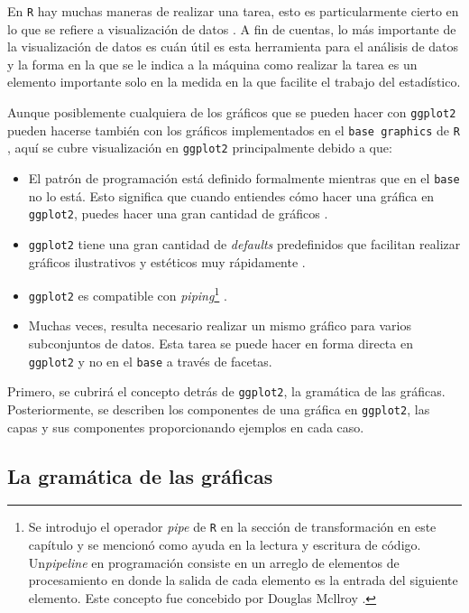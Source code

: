 \documentclass[]{article}
\providecommand{\tightlist}{%
  \setlength{\itemsep}{0pt}\setlength{\parskip}{0pt}}
\let\rmarkdownfootnote\footnote%
\def\footnote{\protect\rmarkdownfootnote}
\begin{document}
En \texttt{R} hay muchas maneras de realizar una tarea, esto es
particularmente cierto en lo que se refiere a visualización de datos
\parencite{basevggplot}. A fin de cuentas, lo más importante de la
visualización de datos es cuán útil es esta herramienta para el análisis
de datos y la forma en la que se le indica a la máquina como realizar la
tarea es un elemento importante solo en la medida en la que facilite el
trabajo del estadístico.

Aunque posiblemente cualquiera de los gráficos que se pueden hacer con
\texttt{ggplot2} pueden hacerse también con los gráficos implementados
en el \texttt{base\ graphics} de \texttt{R} \parencite{basevggplot},
aquí se cubre visualización en \texttt{ggplot2} principalmente debido a
que:

\begin{itemize}
\tightlist
\item
  El patrón de programación está definido formalmente mientras que en el
  \texttt{base} no lo está. Esto significa que cuando entiendes cómo
  hacer una gráfica en \texttt{ggplot2}, puedes hacer una gran cantidad
  de gráficos \parencite{basevggplot}.
\item
  \texttt{ggplot2} tiene una gran cantidad de \emph{defaults}
  predefinidos que facilitan realizar gráficos ilustrativos y estéticos
  muy rápidamente \parencite{reasonsggplot}.
\item
  \texttt{ggplot2} es compatible con
  \emph{piping}\footnote{Se introdujo el operador \textit{pipe} de \texttt{R} en la sección de transformación en este capítulo y se mencionó como ayuda en la lectura y escritura de código. Un\textit{pipeline} en programación consiste en un arreglo de elementos de procesamiento en donde la salida de cada elemento es la entrada del siguiente elemento. Este concepto fue concebido por Douglas Mcllroy \parencite{unixpipes}.}
  \parencite{notggplot}.
\item
  Muchas veces, resulta necesario realizar un mismo gráfico para varios
  subconjuntos de datos. Esta tarea se puede hacer en forma directa en
  \texttt{ggplot2} y no en el \texttt{base} a través de facetas.
\end{itemize}

Primero, se cubrirá el concepto detrás de \texttt{ggplot2}, la gramática
de las gráficas. Posteriormente, se describen los componentes de una
gráfica en \texttt{ggplot2}, las capas y sus componentes proporcionando
ejemplos en cada caso.

\subsection{La gramática de las
gráficas}\label{la-gramatica-de-las-graficas}
\end{document}
